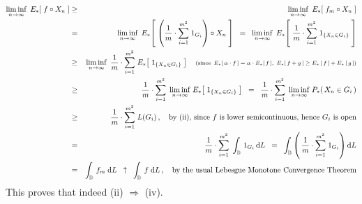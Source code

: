 \begin{eqnarray*}
\underset{n\rightarrow\infty}{\liminf}\;\,E_{*}\!\left[\;f \circ X_{n}\;\right]
&\geq&
	\underset{n\rightarrow\infty}{\liminf}\;\,E_{*}\!\left[\;f_{m} \circ X_{n}\;\right]
\\
&=&
	\underset{n\rightarrow\infty}{\liminf}\;\,
	E_{*}\!\left[\;
		\left(\dfrac{1}{m} \cdot \overset{m^{2}}{\underset{i=1}{\sum}} \; 1_{G_{i}}\right) \circ X_{n}
		\;\right]
\;\; = \;\;
	\underset{n\rightarrow\infty}{\liminf}\;\,
	E_{*}\!\left[\;
		\dfrac{1}{m} \cdot \overset{m^{2}}{\underset{i=1}{\sum}} \; 1_{\{X_{n} \in G_{i}\}}
		\;\right]
\\
&\geq&
	\underset{n\rightarrow\infty}{\liminf}\;\,
	\dfrac{1}{m} \cdot \overset{m^{2}}{\underset{i=1}{\sum}} \; E_{*}\!\left[\; 1_{\{X_{n} \in G_{i}\}} \;\right]
	\quad
	\textnormal{\scriptsize(since \,$E_{*}\!\left[\,\alpha\cdot f\,\right] = \alpha\cdot E_{*}\!\left[\,f\,\right]$,
	\,$E_{*}\!\left[\,f + g\,\right] \geq E_{*}\left[\,f\,\right] + E_{*}\left[\,g\,\right]$)}
\\
&\geq&
	\dfrac{1}{m} \cdot \overset{m^{2}}{\underset{i=1}{\sum}}\;\,
	\underset{n\rightarrow\infty}{\liminf}\;
	E_{*}\!\left[\; 1_{\{X_{n} \in G_{i}\}} \;\right]
\;\; = \;\;
	\dfrac{1}{m} \cdot \overset{m^{2}}{\underset{i=1}{\sum}}\;\,
	\underset{n\rightarrow\infty}{\liminf}\;
	P_{*}\!\left(\, X_{n} \in G_{i} \,\right)
\\
&\geq&
	\dfrac{1}{m} \cdot \overset{m^{2}}{\underset{i=1}{\sum}}\; L(G_{i})\,,
	\quad
	\textnormal{by (ii), since $f$ is lower semicontinuous, hence $G_{i}$ is open}
\\
&=&
	\dfrac{1}{m} \cdot \overset{m^{2}}{\underset{i=1}{\sum}}\; \int_{\D}\, 1_{G_{i}} \,\d L
\;\; = \;\;
	\int_{\D} \left(\,\dfrac{1}{m} \cdot \overset{m^{2}}{\underset{i=1}{\sum}}\; 1_{G_{i}} \right) \d L
\\
&=&
	\int_{\D}\, f_{m} \;\d L
	\;\; \uparrow \;\;
	\int_{\D}\, f \;\d L\,,
	\quad
	\textnormal{by the usual Lebesgue Monotone Convergence Theorem}
\end{eqnarray*}
This proves that indeed (ii) $\Longrightarrow$ (iv).

